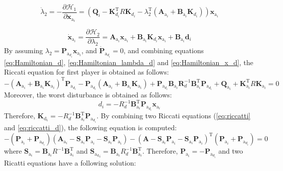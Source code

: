 \documentclass[3p]{elsarticle}
\begin{document}
\begin{equation}\label{eq:Hamiltonian_lambda_d}
    \dot{\lambda}_2 = -\dfrac{\partial \mathcal{H}_1}{\partial \mathbf{x}_{\mathrm{a}_i}} = ( \mathbf{Q}_i - 
    \mathbf{K}_{d_i}^\mathrm{T} R \mathbf{K}_{d_i} -\lambda_2^\mathrm{T}(\mathbf{A}_{\mathrm{a}_i} + \mathbf{B}_{\mathrm{a}_i}\mathbf{K}_{d_i})) \mathbf{x}_{\mathrm{a}_i} 
\end{equation}

\begin{equation}\label{eq:Hamiltonian_x_d}
    \dot{\mathbf{x}}_{\mathrm{a}_i}  = \dfrac{\partial \mathcal{H}_2}{\partial \lambda_2} = \mathbf{A}_{\mathrm{a}_i} \mathbf{x}_{\mathrm{a}_i}  +  \mathbf{B}_{\mathrm{a}_i} \mathbf{K}_{d_i} \mathbf{x}_{\mathrm{a}_i} + \mathbf{B}_{\mathrm{a}_i} \mathbf{d}_i 
\end{equation}
By assuming $\lambda_2 = \mathbf{P}_{\mathrm{a}_{d_i}}\mathbf{x}_{\mathrm{a}_i}$, 
 and $\dot{\mathbf{P}}_{\mathrm{a}_{d_i}} = 0$, and combining equations \eqref{eq:Hamiltonian_d}, \eqref{eq:Hamiltonian_lambda_d} and \eqref{eq:Hamiltonian_x_d}, the Riccati equation for first player is obtained as follows:
 \begin{equation}\label{eq:riccatti_d}
    -( \mathbf{A}_{\mathrm{a}_i} + \mathbf{B}_{\mathrm{a}_i}\mathbf{K}_{\mathrm{a}_i})^\mathrm{T} \mathbf{P}_{\mathrm{a}_{d_i}} - \mathbf{P}_{\mathrm{a}_{d_i}} (\mathbf{A}_{\mathrm{a}_i} + \mathbf{B}_{\mathrm{a}_i}\mathbf{K}_{\mathrm{a}_i}) + \mathbf{P}_{\mathrm{a}_{d_i}} \mathbf{B}_{\mathrm{a}_i} \mathbf{R}_d^{-1} \mathbf{B}_{\mathrm{a}_i}^\mathrm{T} \mathbf{P}_{\mathrm{a}_{d_i}} + \mathbf{Q}_{\mathrm{a}_i}  + \mathbf{K}_{\mathrm{a}_i}^\mathrm{T} R \mathbf{K}_{\mathrm{a}_i} = 0
 \end{equation}
 Moreover, the worst disturbance is obtained as follows:
    \begin{equation}
        d_i = -R_d^{-1}\mathbf{B}_{\mathrm{a}_i}^\mathrm{T}\mathbf{P}_{\mathrm{a}_{d_i}}\mathbf{x}_{\mathrm{a}_i}
    \end{equation}
    Therefore, $\mathbf{K}_{\mathrm{d}_i} = -R_d^{-1}\mathbf{B}_{\mathrm{a}_i}^\mathrm{T}\mathbf{P}_{\mathrm{a}_{d_i}}$.
     By combining two Riccati equations (\eqref{eq:riccatti} and \eqref{eq:riccatti_d}), the following equation is computed:
     \begin{equation}
        -(\mathbf{P}_{\mathrm{a}_{i}} + \mathbf{P}_{\mathrm{a}_{d_i}})\left(
        \mathbf{A}_{\mathrm{a}_i} - \mathbf{S}_{\mathrm{a}_i}\mathbf{P}_{\mathrm{a}_{i}} - \mathbf{S}_{\mathrm{a}_i} \mathbf{P}_{\mathrm{a}_i}
        \right) - \left(
        \mathbf{A} - \mathbf{S}_{\mathrm{a}_i}\mathbf{P}_{\mathrm{a}_{i}} - \mathbf{S}_{\mathrm{a}_i} \mathbf{P}_{\mathrm{a}_i}
        \right)^\mathrm{T}(\mathbf{P}_{\mathrm{a}_{i}} + \mathbf{P}_{\mathrm{a}_{d_i}})=0
    \end{equation}
    where $\mathbf{S}_{\mathrm{a}_i} = \mathbf{B}_{\mathrm{a}_i}{R}^{-1}\mathbf{B}_{\mathrm{a}_i}^\mathrm{T}$ and $\mathbf{S}_{\mathrm{a_d}_i} = \mathbf{B}_{\mathrm{a}_i}{R}_d^{-1}\mathbf{B}_{\mathrm{a}_i}^\mathrm{T}$. Therefore, $\mathbf{P}_{\mathrm{a}_i} = -\mathbf{P}_{\mathrm{a}_{d_i}}$ and two Ricatti equations have a following solution:
\end{document}
